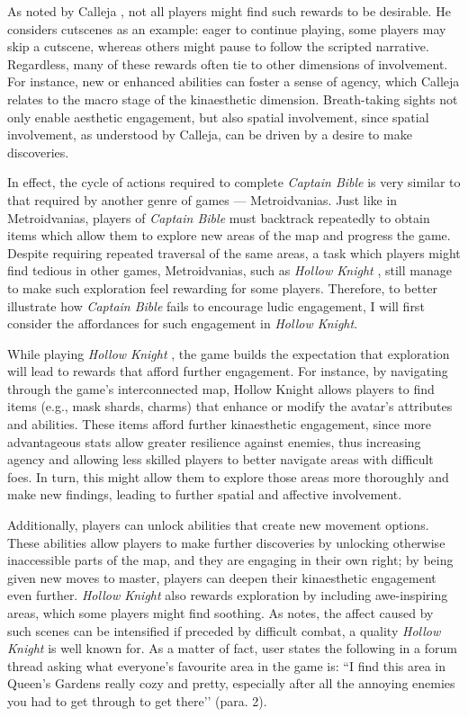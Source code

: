 As noted by Calleja \textcite{calleja_in_game_2011}, not all players might find such rewards to be desirable. He considers cutscenes as an example: eager to continue playing, some players may skip a cutscene, whereas others might pause to follow the scripted narrative. Regardless, many of these rewards often tie to other dimensions of involvement. For instance, new or enhanced abilities can foster a sense of agency, which Calleja relates to the macro stage of the kinaesthetic dimension. Breath-taking sights not only enable aesthetic engagement, but also spatial involvement, since spatial involvement, as understood by Calleja, can be driven by a desire to make discoveries.

In effect, the cycle of actions required to complete \textit{Captain Bible} \parencite{engelbrite_captain_1994} is very similar to that required by another genre of games --- Metroidvanias. Just like in Metroidvanias, players of \textit{Captain Bible} must backtrack repeatedly to obtain items which allow them to explore new areas of the map and progress the game. Despite requiring repeated traversal of the same areas, a task which players might find tedious in other games, Metroidvanias, such as \textit{Hollow Knight} \parencite{team_cherry_hollow_2017}, still manage to make such exploration feel rewarding for some players. Therefore, to better illustrate how \textit{Captain Bible} fails to encourage ludic engagement, I will first consider the affordances for such engagement in \textit{Hollow Knight}.

While playing \textit{Hollow Knight} \parencite{team_cherry_hollow_2017}, the game builds the expectation that exploration will lead to rewards that afford further engagement. For instance, by navigating through the game’s interconnected map, Hollow Knight allows players to find items (e.g., mask shards, charms) that enhance or modify the avatar’s attributes and abilities. These items afford further kinaesthetic engagement, since more advantageous stats allow greater resilience against enemies, thus increasing agency and allowing less skilled players to better navigate areas with difficult foes. In turn, this might allow them to explore those areas more thoroughly and make new findings, leading to further spatial and affective involvement.

Additionally, players can unlock abilities that create new movement options. These abilities allow players to make further discoveries by unlocking otherwise inaccessible parts of the map, and they are engaging in their own right; by being given new moves to master, players can deepen their kinaesthetic engagement even further. \textit{Hollow Knight} \parencite{team_cherry_hollow_2017} also rewards exploration by including awe-inspiring areas, which some players might find soothing. As \textcite[p. 175]{calleja_in_game_2011} notes, the affect caused by such scenes can be intensified if preceded by difficult combat, a quality \textit{Hollow Knight} is well known for. As a matter of fact, user \textcite{crazysquare_comment_2019} states the following in a forum thread asking what everyone’s favourite area in the game is: ``I find this area in Queen's Gardens really cozy and pretty, especially after all the annoying enemies you had to get through to get there’’ (para. 2).

